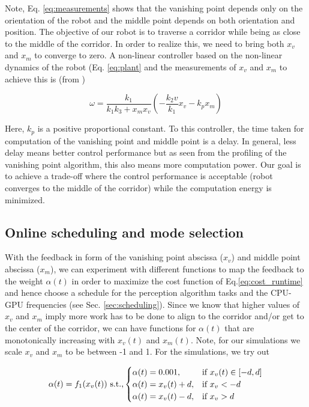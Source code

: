 Note, Eq. \ref{eq:measurements} shows that the vanishing point depends only on the orientation of the robot and the middle point depends on both orientation and position. The objective of our robot is to traverse a corridor while being as close to the middle of the corridor. In order to realize this, we need to bring both $x_v$ and $x_m$ to converge to zero. A non-linear controller based on the non-linear dynamics of the robot (Eq. \ref{eq:plant} and the measurements of $x_v$ and $x_m$ to achieve this is (from \cite{VP2})

\begin{equation}
\omega = \frac{k_1}{k_1k_3+x_mx_v}(-\frac{k_2v}{k_1}x_v -k_px_m)
\label{eq:controller}
\end{equation}

Here, $k_p$ is a positive proportional constant. To this controller, the time taken for computation of the vanishing point and middle point is a delay. In general, less delay means better control performance but as seen from the profiling of the vanishing point algorithm, this also means more computation power. Our goal is to achieve a trade-off where the control performance is acceptable (robot converges to the middle of the corridor) while the computation energy is minimized. 

\subsection{Online scheduling and mode selection}

With the feedback in form of the vanishing point abscissa ($x_v$) and middle point abscissa ($x_m$), we can experiment with different functions to map the feedback to the weight $\alpha(t)$ in order to maximize the cost function of Eq.\ref{eq:cost_runtime} and hence choose a schedule for the perception algorithm tasks and the CPU-GPU frequencies (see Sec. \ref{sec:scheduling}). 
Since we know that higher values of $x_v$ and $x_m$ imply more work has to be done to align to the corridor and/or get to the center of the corridor, we can have functions for $\alpha(t)$ that are monotonically increasing with $x_v(t)$ and $x_m(t)$. Note, for our simulations we scale $x_v$ and $x_m$ to be between -1 and 1. For the simulations, we try out

{\footnotesize{
\begin{equation}
\alpha(t) = f_1(x_v(t)) \text{ s.t.,} \\
\begin{cases}
\alpha(t) = 0.001,&\text{if }x_v(t)\in[-d,d]\\
\alpha(t) = x_v(t)+d,&\text{if }x_v<-d\\
\alpha(t) = x_v(t)-d,&\text{if }x_v>d
\end{cases}
\label{eq:f1}
\end{equation}
}}


